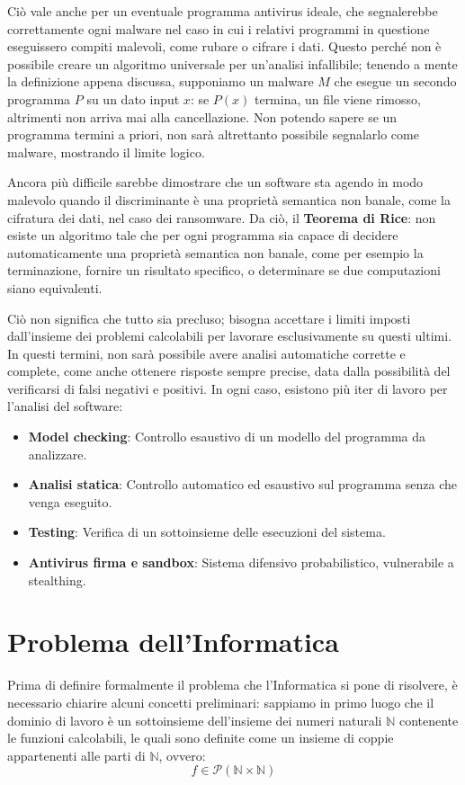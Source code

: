\noindent Ciò vale anche per un eventuale programma antivirus ideale, che segnalerebbe correttamente ogni malware nel caso in cui i relativi programmi
in questione eseguissero compiti malevoli, come rubare o cifrare i dati. Questo perché non è possibile creare un algoritmo universale per un'analisi
infallibile; tenendo a mente la definizione appena discussa, supponiamo un malware $M$ che esegue un secondo programma $P$ su un dato input $x$: se
$P(x)$ termina, un file viene rimosso, altrimenti non arriva mai alla cancellazione. Non potendo sapere se un programma termini a priori, non sarà
altrettanto possibile segnalarlo come malware, mostrando il limite logico.\par
Ancora più difficile sarebbe dimostrare che un software sta agendo in modo malevolo quando il discriminante è una proprietà semantica non banale, come
la cifratura dei dati, nel caso dei ransomware. Da ciò, il \textbf{Teorema di Rice}: non esiste un algoritmo tale che per ogni programma sia capace di
decidere automaticamente una proprietà semantica non banale, come per esempio la terminazione, fornire un risultato specifico, o determinare se due
computazioni siano equivalenti.\par
Ciò non significa che tutto sia precluso; bisogna accettare i limiti imposti dall'insieme dei problemi calcolabili per lavorare esclusivamente su questi
ultimi. In questi termini, non sarà possibile avere analisi automatiche corrette e complete, come anche ottenere risposte sempre precise, data dalla
possibilità del verificarsi di falsi negativi e positivi. In ogni caso, esistono più iter di lavoro per l'analisi del software: \begin{itemize}
	\item \textbf{Model checking}: Controllo esaustivo di un modello del programma da analizzare.
	\item \textbf{Analisi statica}: Controllo automatico ed esaustivo sul programma senza che venga eseguito.
	\item \textbf{Testing}: Verifica di un sottoinsieme delle esecuzioni del sistema.
	\item \textbf{Antivirus firma e sandbox}: Sistema difensivo probabilistico, vulnerabile a stealthing.
\end{itemize}

%

\section{Problema dell'Informatica}
Prima di definire formalmente il problema che l'Informatica si pone di risolvere, è necessario chiarire alcuni concetti preliminari: sappiamo in primo
luogo che il dominio di lavoro è un sottoinsieme dell'insieme dei numeri naturali $\mathbb{N}$ contenente le funzioni calcolabili, le quali sono
definite come un insieme di coppie appartenenti alle parti di $\mathbb{N}$, ovvero: \[
	f\in \mathcal{P}(\mathbb{N}\times \mathbb{N})
\]

